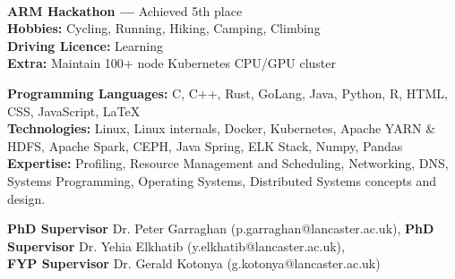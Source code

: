 \documentclass[10pt,a4paper]{base}
\begin{document}
\begin{fullwidth}
 \\

\begin{multicols}{2}
\textbf{ARM Hackathon ---} Achieved 5th place \\
\vspace{2mm}
\textbf{Hobbies: } Cycling, Running, Hiking, Camping, Climbing \\
\textbf{Driving Licence: } Learning \\
\textbf{Extra: } Maintain 100+ node Kubernetes CPU/GPU cluster \\

\columnbreak

\textbf{Programming Languages: } C, C++, Rust, GoLang, Java, Python, R, HTML, CSS, JavaScript, \LaTeX \\
\vspace{2mm}
\textbf{Technologies: } Linux, Linux internals, Docker, Kubernetes, Apache YARN \& HDFS, Apache Spark, CEPH, Java Spring, ELK Stack, Numpy, Pandas \\
\vspace{2mm}
\textbf{Expertise: } Profiling, Resource Management and Scheduling, Networking, DNS, Systems Programming, Operating Systems, Distributed Systems concepts and design. \\
\vspace{2mm}
\end{multicols}

\small
\textcolor{accent}{\textbf{PhD Supervisor}} Dr. Peter Garraghan (p.garraghan@lancaster.ac.uk),
\textcolor{accent}{\textbf{PhD Supervisor}}  Dr. Yehia Elkhatib (y.elkhatib@lancaster.ac.uk), \\
\textcolor{accent}{\textbf{FYP Supervisor}}  Dr. Gerald Kotonya (g.kotonya@lancaster.ac.uk)


\end{fullwidth}
\end{document}
